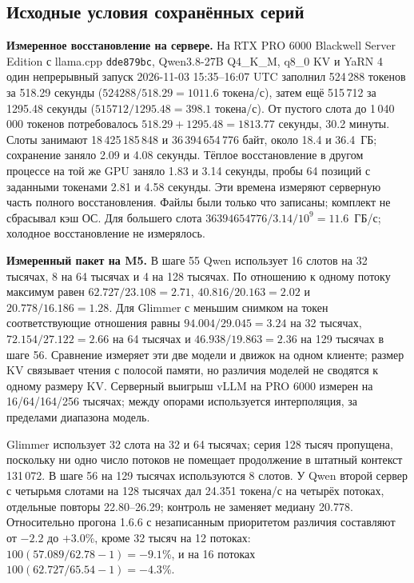 \subsection{Исходные условия сохранённых серий}
\label{app:retained-series-conditions}

\textbf{Измеренное восстановление на сервере.} На RTX PRO 6000 Blackwell Server Edition с llama.cpp \texttt{dde879bc}, Qwen3.8-27B Q4\_K\_M, q8\_0 KV и YaRN 4 один непрерывный запуск 2026-11-03 15:35--16:07 UTC заполнил 524\,288 токенов за 518.29 секунды ($524288/518.29=1011.6$ токена/с), затем ещё 515\,712 за 1295.48 секунды ($515712/1295.48=398.1$ токена/с). От пустого слота до 1\,040\,000 токенов потребовалось $518.29+1295.48=1813.77$ секунды, 30.2 минуты. Слоты занимают 18\,425\,185\,848 и 36\,394\,654\,776 байт, около 18.4 и 36.4~ГБ; сохранение заняло 2.09 и 4.08 секунды. Тёплое восстановление в другом процессе на той же GPU заняло 1.83 и 3.14 секунды, пробы 64 позиций с заданными токенами 2.81 и 4.58 секунды. Эти времена измеряют серверную часть полного восстановления. Файлы были только что записаны; комплект не сбрасывал кэш ОС. Для большего слота $36394654776/3.14/10^9=11.6$~ГБ/с; холодное восстановление не измерялось.

\textbf{Измеренный пакет на M5.} В шаге 55 Qwen использует 16 слотов на 32 тысячах, 8 на 64 тысячах и 4 на 128 тысячах. По отношению к одному потоку максимум равен $62.727/23.108=2.71$, $40.816/20.163=2.02$ и $20.778/16.186=1.28$. Для Glimmer с меньшим снимком на токен соответствующие отношения равны $94.004/29.045=3.24$ на 32 тысячах, $72.154/27.122=2.66$ на 64 тысячах и $46.938/19.863=2.36$ на 129 тысячах в шаге 56. Сравнение измеряет эти две модели и движок на одном клиенте; размер KV связывает чтения с полосой памяти, но различия моделей не сводятся к одному размеру KV. Серверный выигрыш vLLM на PRO 6000 измерен на 16/64/164/256 тысячах; между опорами используется интерполяция, за пределами диапазона модель.

Glimmer использует 32 слота на 32 и 64 тысячах; серия 128 тысяч пропущена, поскольку ни одно число потоков не помещает продолжение в штатный контекст 131\,072. В шаге 56 на 129 тысячах используются 8 слотов. У Qwen второй сервер с четырьмя слотами на 128 тысячах дал 24.351 токена/с на четырёх потоках, отдельные повторы 22.80--26.29; контроль не заменяет медиану 20.778. Относительно прогона 1.6.6 с незаписанным приоритетом различия составляют от $-2.2$ до $+3.0$\%, кроме 32 тысяч на 12 потоках: $100(57.089/62.78-1)=-9.1$\%, и на 16 потоках $100(62.727/65.54-1)=-4.3$\%.

